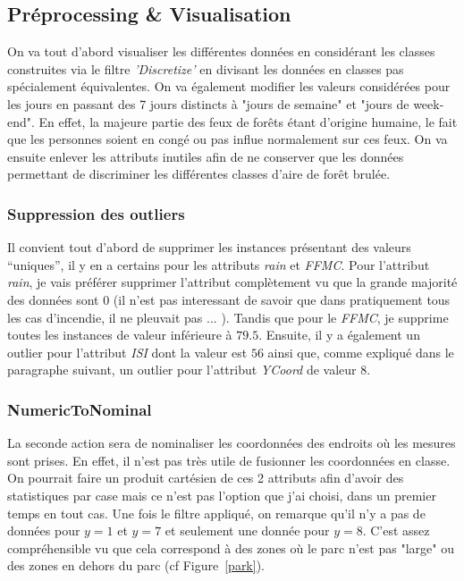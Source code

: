 \documentclass{article}
\begin{document}
\begin{sffamily}
\newpage

\subsection{Préprocessing \& Visualisation}

On va tout d'abord visualiser les différentes données en considérant les classes construites via le filtre \textit{'Discretize'} 
en divisant les données en classes pas spécialement équivalentes. On va également modifier les valeurs considérées pour les 
jours en passant des 7 jours distincts à "jours de semaine" et "jours de week-end". En effet, la majeure partie des feux de 
forêts étant d'origine humaine, le fait que les personnes soient en congé ou pas influe normalement sur ces feux. On va ensuite 
enlever les attributs inutiles afin de ne conserver que les données permettant de discriminer les différentes classes d'aire de 
forêt brulée.

\subsubsection*{Suppression des outliers}

Il convient tout d'abord de supprimer les instances présentant des valeurs ``uniques'', il y en a certains pour les attributs 
\textit{rain} et \textit{FFMC}. Pour l'attribut \textit{rain}, je vais préférer supprimer l'attribut complètement vu que la 
grande majorité des données sont 0 (il n'est pas interessant de savoir que dans pratiquement tous les cas d'incendie, il ne pleuvait pas ... ). 
Tandis que pour le \textit{FFMC}, je supprime toutes les instances de valeur inférieure à $79.5$. Ensuite, il y a également un outlier pour 
l'attribut \textit{ISI} dont la valeur est $56$ ainsi que, comme expliqué dans le paragraphe suivant, un outlier pour l'attribut \textit{YCoord} de 
valeur $8$.

\subsubsection*{NumericToNominal}

La seconde action sera de nominaliser les coordonnées des endroits où les mesures sont prises. En effet, il n'est pas très utile 
de fusionner les coordonnées en classe. On pourrait faire un produit cartésien de ces 2 attributs afin d'avoir des statistiques
par case mais ce n'est pas l'option que j'ai choisi, dans un premier temps en tout cas. Une fois le filtre appliqué, on remarque 
qu'il n'y a pas de données pour $y=1$ et $y=7$ et seulement une donnée pour $y=8$. C'est assez compréhensible vu que cela 
correspond à des zones où le parc n'est pas "large" ou des zones en dehors du parc (cf Figure~\ref{park}).


\end{sffamily}
\end{document}
